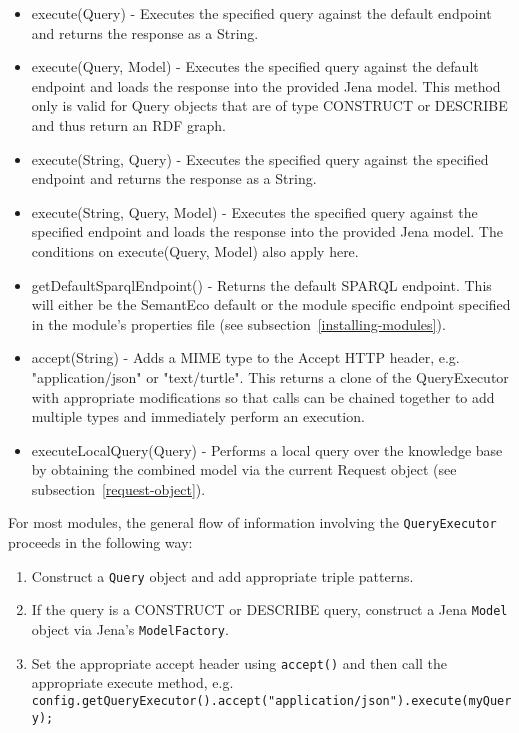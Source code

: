 \documentclass[letterpaper]{report}
\begin{document}
\begin{itemize}
\item execute(Query) - Executes the specified query against the default endpoint and returns the response as a String.
\item execute(Query, Model) - Executes the specified query against the default endpoint and loads the response into the provided Jena model. This method only is valid for Query objects that are of type CONSTRUCT or DESCRIBE and thus return an RDF graph.
\item execute(String, Query) - Executes the specified query against the specified endpoint and returns the response as a String.
\item execute(String, Query, Model) - Executes the specified query against the specified endpoint and loads the response into the provided Jena model. The conditions on execute(Query, Model) also apply here.
\item getDefaultSparqlEndpoint() - Returns the default SPARQL endpoint. This will either be the SemantEco default or the module specific endpoint specified in the module's properties file (see subsection~\ref{installing-modules}).
\item accept(String) - Adds a MIME type to the Accept HTTP header, e.g. "application/json" or "text/turtle". This returns a clone of the QueryExecutor with appropriate modifications so that calls can be chained together to add multiple types and immediately perform an execution.
\item executeLocalQuery(Query) - Performs a local query over the knowledge base by obtaining the combined model via the current Request object (see subsection~\ref{request-object}).
\end{itemize}

For most modules, the general flow of information involving the \texttt{QueryExecutor} proceeds in the following way:

\begin{enumerate}
\item Construct a \texttt{Query} object and add appropriate triple patterns.
\item If the query is a CONSTRUCT or DESCRIBE query, construct a Jena \texttt{Model} object via Jena's \texttt{ModelFactory}.
\item Set the appropriate accept header using \texttt{accept()} and then call the appropriate execute method, e.g. \texttt{config.getQueryExecutor().accept("application/json").execute(myQuery);}
\end{enumerate}
\end{document}
